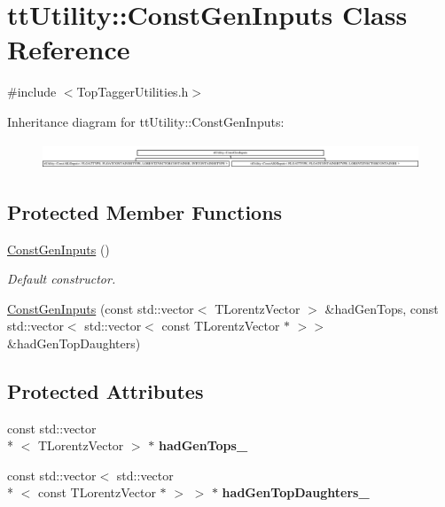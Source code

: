 \hypertarget{classttUtility_1_1ConstGenInputs}{\section{tt\-Utility\-:\-:Const\-Gen\-Inputs Class Reference}
\label{classttUtility_1_1ConstGenInputs}
}


{\ttfamily \#include $<$Top\-Tagger\-Utilities.\-h$>$}

Inheritance diagram for tt\-Utility\-:\-:Const\-Gen\-Inputs\-:\begin{figure}[H]
\begin{center}
\leavevmode
\includegraphics[height=0.773481cm]{classttUtility_1_1ConstGenInputs}
\end{center}
\end{figure}
\subsection*{Protected Member Functions}
\begin{DoxyCompactItemize}
\item 
\hypertarget{classttUtility_1_1ConstGenInputs_a520c5a594261d877f0fb4ad46aedc71e}{\hyperlink{classttUtility_1_1ConstGenInputs_a520c5a594261d877f0fb4ad46aedc71e}{Const\-Gen\-Inputs} ()}\label{classttUtility_1_1ConstGenInputs_a520c5a594261d877f0fb4ad46aedc71e}

\begin{DoxyCompactList}\small\item\em Default constructor. \end{DoxyCompactList}\item 
\hyperlink{classttUtility_1_1ConstGenInputs_a36cd5945c3febe03ded92e506d86e7c4}{Const\-Gen\-Inputs} (const std\-::vector$<$ T\-Lorentz\-Vector $>$ \&had\-Gen\-Tops, const std\-::vector$<$ std\-::vector$<$ const T\-Lorentz\-Vector $\ast$ $>$$>$ \&had\-Gen\-Top\-Daughters)
\end{DoxyCompactItemize}
\subsection*{Protected Attributes}
\begin{DoxyCompactItemize}
\item 
\hypertarget{classttUtility_1_1ConstGenInputs_aa81a1bd7a31b8a11ead74009bbfba1f0}{const std\-::vector\\*
$<$ T\-Lorentz\-Vector $>$ $\ast$ {\bfseries had\-Gen\-Tops\-\_\-}}\label{classttUtility_1_1ConstGenInputs_aa81a1bd7a31b8a11ead74009bbfba1f0}

\item 
\hypertarget{classttUtility_1_1ConstGenInputs_a87acbb7879cdbcb43b4f08adfe78d93e}{const std\-::vector$<$ std\-::vector\\*
$<$ const T\-Lorentz\-Vector $\ast$ $>$ $>$ $\ast$ {\bfseries had\-Gen\-Top\-Daughters\-\_\-}}\label{classttUtility_1_1ConstGenInputs_a87acbb7879cdbcb43b4f08adfe78d93e}

\end{DoxyCompactItemize}


